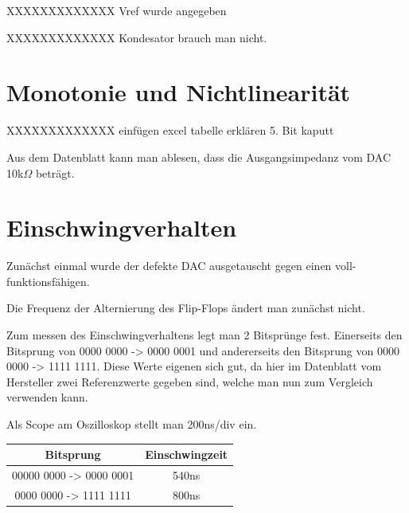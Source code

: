 XXXXXXXXXXXXX Vref wurde angegeben

XXXXXXXXXXXXX Kondesator brauch man nicht.

\section{Monotonie und Nichtlinearität}
XXXXXXXXXXXXX 
einfügen excel tabelle
erklären 5. Bit kaputt


Aus dem Datenblatt kann man ablesen, dass die Ausgangsimpedanz vom
DAC 10k$\Omega$ beträgt.



\section{Einschwingverhalten}

Zunächst einmal wurde der defekte DAC ausgetauscht 
gegen einen voll-funktionsfähigen. \newline

Die Frequenz der Alternierung des Flip-Flops ändert man zunächst nicht. \newline

Zum messen des Einschwingverhaltens legt man 2 Bitsprünge fest.
Einerseits den Bitsprung von 0000 0000 -> 0000 0001 und andererseits 
den Bitsprung von 0000 0000 -> 1111 1111.
Diese Werte eigenen sich gut, da hier im Datenblatt vom Hersteller 
zwei Referenzwerte gegeben sind, welche man nun zum Vergleich verwenden kann.\newline

Als Scope am Oszilloskop stellt man 200ns/div ein. \newline


\begin{tabular}[h]{c|c}
    Bitsprung & Einschwingzeit \\
    \hline
    00000 0000 -> 0000 0001 & 540ns\\
    \hline
    0000 0000 -> 1111 1111 & 800ns \\

\end{tabular}

